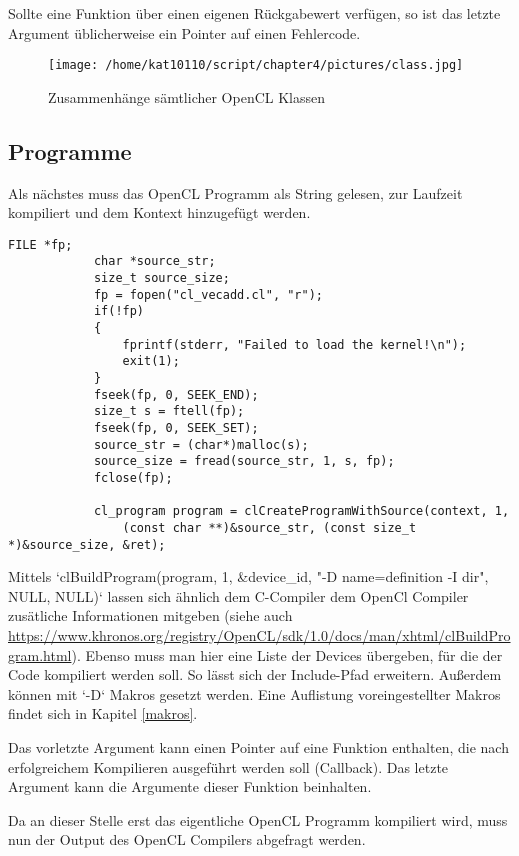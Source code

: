 			Sollte eine Funktion über einen eigenen Rückgabewert verfügen, so ist das letzte Argument üblicherweise ein Pointer auf einen Fehlercode.
			\begin{figure}[h]
				\centering
				\texttt{[image: /home/kat10110/script/chapter4/pictures/class.jpg]}
				\caption{Zusammenhänge sämtlicher OpenCL Klassen}
				\label{4:class}
			\end{figure}				
				
			\subsection{Programme}
			Als nächstes muss das OpenCL Programm als String gelesen, zur Laufzeit kompiliert und dem Kontext hinzugefügt werden. 
			\begin{lstlisting}[caption=~OpenCL Programm]
			FILE *fp;
			char *source_str;
			size_t source_size;
			fp = fopen("cl_vecadd.cl", "r");
			if(!fp)
			{
				fprintf(stderr, "Failed to load the kernel!\n");
				exit(1);
			}
			fseek(fp, 0, SEEK_END);
			size_t s = ftell(fp);
			fseek(fp, 0, SEEK_SET); 
			source_str = (char*)malloc(s);
			source_size = fread(source_str, 1, s, fp);
			fclose(fp);
			
			cl_program program = clCreateProgramWithSource(context, 1, 
				(const char **)&source_str, (const size_t *)&source_size, &ret);
			\end{lstlisting}
			
			Mittels \li`clBuildProgram(program, 1, &device_id, "-D name=definition -I dir", NULL, NULL)` lassen sich ähnlich dem C-Compiler dem OpenCl Compiler zusätliche Informationen mitgeben (siehe auch \url{https://www.khronos.org/registry/OpenCL/sdk/1.0/docs/man/xhtml/clBuildProgram.html}). Ebenso muss man hier eine Liste der Devices übergeben, für die der Code kompiliert werden soll. So lässt sich der Include-Pfad erweitern. Außerdem können mit \li`-D` Makros gesetzt werden. Eine Auflistung voreingestellter Makros findet sich in Kapitel \ref{makros}.
			
			Das vorletzte Argument kann einen Pointer auf eine Funktion enthalten, die nach erfolgreichem Kompilieren ausgeführt werden soll (Callback). Das letzte Argument kann die Argumente dieser Funktion beinhalten.
			
			Da an dieser Stelle erst das eigentliche OpenCL Programm kompiliert wird, muss nun der Output des OpenCL Compilers abgefragt werden.
			
